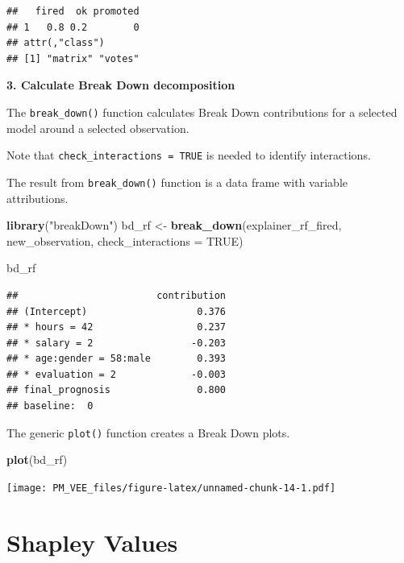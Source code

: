\documentclass[]{book}
\newenvironment{Shaded}{\begin{snugshade}}{\end{snugshade}}
\newcommand{\DataTypeTok}[1]{\textcolor[rgb]{0.13,0.29,0.53}{#1}}
\newcommand{\KeywordTok}[1]{\textcolor[rgb]{0.13,0.29,0.53}{\textbf{#1}}}
\newcommand{\NormalTok}[1]{#1}
\newcommand{\OtherTok}[1]{\textcolor[rgb]{0.56,0.35,0.01}{#1}}
\newcommand{\StringTok}[1]{\textcolor[rgb]{0.31,0.60,0.02}{#1}}
\theoremstyle{definition}
\theoremstyle{definition}
\theoremstyle{definition}
\theoremstyle{remark}
\begin{document}
\begin{verbatim}
##   fired  ok promoted
## 1   0.8 0.2        0
## attr(,"class")
## [1] "matrix" "votes"
\end{verbatim}

\textbf{3. Calculate Break Down decomposition}

The \texttt{break\_down()} function calculates Break Down contributions
for a selected model around a selected observation.

Note that \texttt{check\_interactions\ =\ TRUE} is needed to identify
interactions.

The result from \texttt{break\_down()} function is a data frame with
variable attributions.

\begin{Shaded}
\begin{Highlighting}[]
\KeywordTok{library}\NormalTok{(}\StringTok{"breakDown"}\NormalTok{)}
\NormalTok{bd_rf <-}\StringTok{ }\KeywordTok{break_down}\NormalTok{(explainer_rf_fired,}
\NormalTok{                 new_observation,}
                 \DataTypeTok{check_interactions =} \OtherTok{TRUE}\NormalTok{)}

\NormalTok{bd_rf}
\end{Highlighting}
\end{Shaded}

\begin{verbatim}
##                        contribution
## (Intercept)                   0.376
## * hours = 42                  0.237
## * salary = 2                 -0.203
## * age:gender = 58:male        0.393
## * evaluation = 2             -0.003
## final_prognosis               0.800
## baseline:  0
\end{verbatim}

The generic \texttt{plot()} function creates a Break Down plots.

\begin{Shaded}
\begin{Highlighting}[]
\KeywordTok{plot}\NormalTok{(bd_rf) }
\end{Highlighting}
\end{Shaded}

\texttt{[image: PM\_VEE\_files/figure-latex/unnamed-chunk-14-1.pdf]}

\hypertarget{shapley}{%
\chapter{Shapley Values}\label{shapley}}
\end{document}
